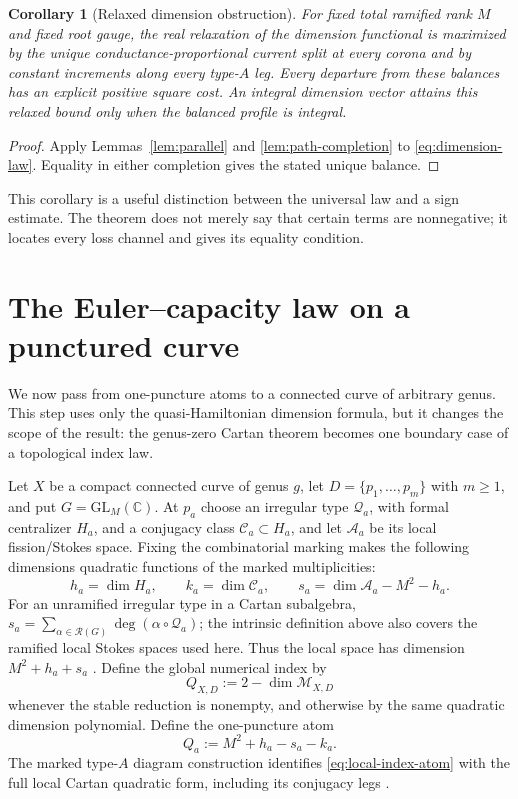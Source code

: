 \documentclass[11pt,a4paper]{amsart}
\theoremstyle{plain}
\newtheorem{corollary}[theorem]{Corollary}
\theoremstyle{definition}
\newcommand{\CC}{\mathbb C}
\newcommand{\Mcal}{\mathcal M}
\begin{document}
\begin{corollary}[Relaxed dimension obstruction]\label{cor:dimension-obstruction}
For fixed total ramified rank $M$ and fixed root gauge, the real relaxation of the dimension
functional is maximized by the unique conductance-proportional current split at every corona and by
constant increments along every type-$A$ leg.  Every departure from these balances has an explicit
positive square cost.  An integral dimension vector attains this relaxed bound only when the
balanced profile is integral.
\end{corollary}

\begin{proof}
Apply Lemmas~\ref{lem:parallel} and \ref{lem:path-completion} to
\eqref{eq:dimension-law}.  Equality in either completion gives the stated unique balance.
\end{proof}

This corollary is a useful distinction between the universal law and a sign estimate.  The theorem
does not merely say that certain terms are nonnegative; it locates every loss channel and gives its
equality condition.

\section{The Euler--capacity law on a punctured curve}\label{sec:global}

We now pass from one-puncture atoms to a connected curve of arbitrary genus.  This step uses only
the quasi-Hamiltonian dimension formula, but it changes the scope of the result: the genus-zero
Cartan theorem becomes one boundary case of a topological index law.

Let $X$ be a compact connected curve of genus $g$, let
$D=\{p_1,\ldots,p_m\}$ with $m\ge1$, and put $G=\mathrm{GL}_M(\CC)$.  At $p_a$ choose an irregular
type $\mathcal Q_a$, with formal centralizer $H_a$, and a conjugacy class
$\mathcal C_a\subset H_a$, and let $\mathcal A_a$ be its local fission/Stokes space.  Fixing the
combinatorial marking makes the following dimensions quadratic functions of the marked
multiplicities:
\[
 h_a=\dim H_a,\qquad k_a=\dim\mathcal C_a,\qquad
 s_a=\dim\mathcal A_a-M^2-h_a.
\]
For an unramified irregular type in a Cartan subalgebra,
$s_a=\sum_{\alpha\in\mathcal R(G)}\deg(\alpha\circ\mathcal Q_a)$; the intrinsic definition above
also covers the ramified local Stokes spaces used here.  Thus the local space has dimension
$M^2+h_a+s_a$ \cite{Boalch2014Geometry,BoalchYamakawa2015Twisted}.  Define the global numerical index by
\begin{equation}\label{eq:global-index-definition}
 Q_{X,D}:=2-\dim\Mcal_{X,D}
\end{equation}
whenever the stable reduction is nonempty, and otherwise by the same quadratic dimension
polynomial.  Define the one-puncture atom
\begin{equation}\label{eq:local-index-atom}
                         Q_a:=M^2+h_a-s_a-k_a.
\end{equation}
The marked type-$A$ diagram construction identifies \eqref{eq:local-index-atom} with the full local
Cartan quadratic form, including its conjugacy legs
\cite{BoalchYamakawa2020,Doucot2021Diagrams}.
\end{document}
